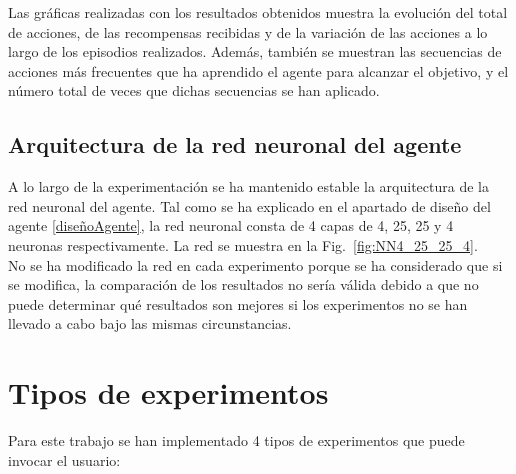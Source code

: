 Las gráficas realizadas con los resultados obtenidos muestra la evolución del total de acciones, de las recompensas recibidas y de la variación de las acciones a lo largo de los episodios realizados. Además, también se muestran las secuencias de acciones más frecuentes que ha aprendido el agente para alcanzar el objetivo, y el número total de veces que dichas secuencias se han aplicado. 

\subsection{Arquitectura de la red neuronal del agente}

A lo largo de la experimentación se ha mantenido estable la arquitectura de la red neuronal del agente. Tal como se ha explicado en el apartado de diseño del agente \ref{diseñoAgente}, la red neuronal consta de 4 capas de 4, 25, 25 y 4 neuronas respectivamente. La red se muestra en la Fig.~\ref{fig:NN4_25_25_4}. \\

No se ha modificado la red en cada experimento porque se ha considerado que si se modifica, la comparación de los resultados no sería válida debido a que no puede determinar qué resultados son mejores si los experimentos no se han llevado a cabo bajo las mismas circunstancias. 

\section{Tipos de experimentos} \label{tiposExperimentos}

Para este trabajo se han implementado 4 tipos de experimentos que puede invocar el usuario:

